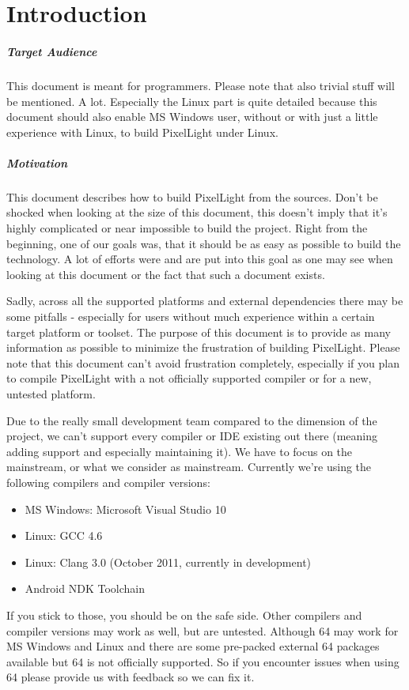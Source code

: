 \chapter{Introduction}


\paragraph{Target Audience}
This document is meant for programmers. Please note that also trivial stuff will be mentioned. A lot. Especially the Linux part is quite detailed because this document should also enable MS Windows user, without or with just a little experience with Linux, to build PixelLight under Linux.


\paragraph{Motivation}
This document describes how to build PixelLight from the sources. Don't be shocked when looking at the size of this document, this doesn't imply that it's highly complicated or near impossible to build the project. Right from the beginning, one of our goals was, that it should be as easy as possible to build the technology. A lot of efforts were and are put into this goal as one may see when looking at this document or the fact that such a document exists.

Sadly, across all the supported platforms and external dependencies there may be some pitfalls - especially for users without much experience within a certain target platform or toolset. The purpose of this document is to provide as many information as possible to minimize the frustration of building PixelLight. Please note that this document can't avoid frustration completely, especially if you plan to compile PixelLight with a not officially supported compiler or for a new, untested platform.

Due to the really small development team compared to the dimension of the project, we can't support every compiler or IDE existing out there (meaning adding support and especially maintaining it). We have to focus on the mainstream, or what we consider as mainstream. Currently we're using the following compilers and compiler versions:
\begin{itemize}
\item{MS Windows: Microsoft Visual Studio 10}
\item{Linux: \ac{GCC} 4.6}
\item{Linux: Clang 3.0 (October 2011, currently in development)}
\item{Android \ac{NDK} Toolchain}
\end{itemize}
If you stick to those, you should be on the safe side. Other compilers and compiler versions may work as well, but are untested. Although \SI{64}{\bit} may work for MS Windows and Linux and there are some pre-packed external \SI{64}{\bit} packages available but \SI{64}{\bit} is not officially supported. So if you encounter issues when using \SI{64}{\bit} please provide us with feedback so we can fix it.

